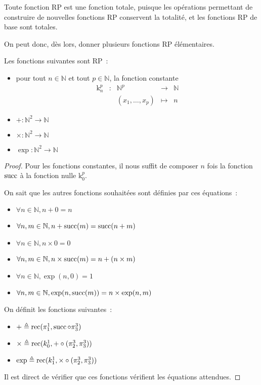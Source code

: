 \begin{remark}
  Toute fonction RP est une fonction totale, puisque les opérations permettant
  de construire de nouvelles fonctions RP conservent la totalité, et les
  fonctions RP de base sont totales.
\end{remark}

On peut donc, dès lors, donner plusieurs fonctions RP élémentaires.

\begin{proposition}
  Les fonctions suivantes sont RP~:
  \begin{itemize}
  \item pour tout $n \in \mathbb N$ et tout $p \in \mathbb N$, la fonction
    constante
    \[\begin{array}{ccccc}
    \mathrm k_n^p &:& \mathbb N^p&\longrightarrow &\mathbb N\\
    & & (x_1,\ldots,x_p) &\longmapsto & n
    \end{array}\]
  \item $+ : \mathbb N^2 \to \mathbb N$
  \item $\times : \mathbb N^2 \to \mathbb N$
  \item $\exp : \mathbb N^2 \to \mathbb N$
  \end{itemize}
\end{proposition}

\begin{proof}
  Pour les fonctions constantes, il nous suffit de composer $n$ fois la fonction
  $\operatorname{succ}$ à la fonction nulle $\mathrm k_0^p$.
  
  On sait que les autres fonctions souhaitées sont définies par ces équations~:
  \begin{itemize}
  \item $\forall n \in \mathbb N, n+0 = n$
  \item $\forall n,m \in \mathbb N, n + \operatorname{succ}(m) = \operatorname{succ}(n+m)$
  \item $\forall n \in \mathbb N, n \times 0 = 0$
  \item $\forall n,m \in \mathbb N, n \times \operatorname{succ}(m) = n + (n\times m)$
  \item $\forall n \in \mathbb N, \exp(n,0) = 1$
  \item $\forall n,m\in \mathbb N, \exp(n,\operatorname{succ}(m)) = n \times \exp(n,m)$
  \end{itemize}
  On définit les fonctions suivantes~:
  \begin{itemize}
  \item $+ \triangleq \operatorname{rec}(\pi_1^1,\operatorname{succ}\circ \pi_3^3)$
  \item $\times \triangleq \operatorname{rec}(k_0^1,+ \circ (\pi_2^3,\pi_3^3))$
  \item $\exp \triangleq \operatorname{rec}(k_1^1,\times\circ (\pi_2^3,\pi_3^3))$
  \end{itemize}
  Il est direct de vérifier que ces fonctions vérifient les équations attendues.
\end{proof}

